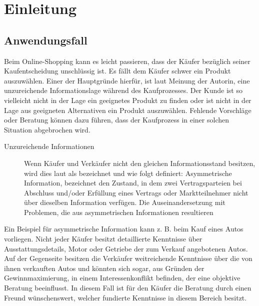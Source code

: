 
\chapter{Einleitung}


\section{Anwendungsfall}

Beim Online-Shopping kann es leicht passieren, dass der Käufer bezüglich seiner Kaufentscheidung unschlüssig ist. Es fällt dem Käufer schwer ein Produkt auszuwählen. Einer der Hauptgründe hierfür, ist laut Meinung der Autorin, eine unzureichende Informationslage während des Kaufprozesses. Der Kunde ist so vielleicht nicht in der Lage ein geeignetes Produkt zu finden oder ist nicht in der Lage aus geeigneten Alternativen ein Produkt auszuwählen. Fehlende Vorschläge oder Beratung können dazu führen, dass der Kaufprozess in einer solchen Situation abgebrochen wird.


\begin{description}
\item[Unzureichende Informationen] Wenn Käufer und Verkäufer nicht den gleichen Informationsstand besitzen, wird dies laut \textcite{akerlof:lemons} als  bezeichnet und wie folgt definiert: \glqq Asymmetrische Information, bezeichnet den Zustand, in dem zwei Vertragsparteien bei Abschluss und/oder Erfüllung eines Vertrags oder Marktteilnehmer nicht über dieselben Information verfügen. Die Auseinandersetzung mit Problemen, die aus asymmetrischen Informationen resultieren\grqq
\end{description}

Ein Beispiel für asymmetrische Information kann z. B. beim Kauf eines Autos vorliegen. Nicht jeder Käufer besitzt detaillierte Kenntnisse über Ausstattungsdetails, Motor oder Getriebe der zum Verkauf angebotenen Autos. Auf der Gegenseite besitzen die Verkäufer weitreichende Kenntnisse über die von ihnen verkauften Autos und könnten sich sogar, aus Gründen der Gewinnmaximierung, in einem Interessenkonflikt befinden, der eine objektive Beratung beeinflusst. In diesem Fall ist für den Käufer die Beratung durch einen Freund wünschenswert, welcher fundierte Kenntnisse in diesem Bereich besitzt.


